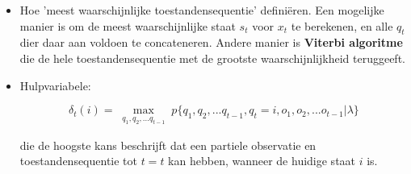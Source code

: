 \begin{itemize}
\begin{itemize}
		\item Hoe 'meest waarschijnlijke toestandensequentie' definiëren. Een mogelijke manier is om de meest waarschijnlijke staat $s_t$ voor $x_t$ te berekenen, en alle $q_t$ dier daar aan voldoen te concateneren.
		Andere manier is \textbf{Viterbi algoritme} die de hele toestandensequentie met de grootste waarschijnlijkheid teruggeeft.
		
		\item Hulpvariabele:
		
		$$\delta_t(i) = \max_{\substack{q_1, q_2, ... q_{t-1}}} p\{q_1, q_2, ... q_{t - 1}, q_t = i, o_1, o_2, ... o_{t - 1} | \lambda \}$$
		
		die de hoogste kans beschrijft dat een partiele observatie en toestandensequentie tot $t = t$ kan hebben, wanneer de huidige staat $i$ is.
	\end{itemize}
\end{itemize}


